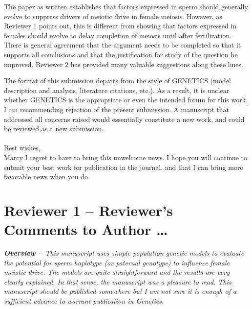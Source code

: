 \documentclass[12pt,letterpaper]{article}
\begin{document}
The paper as written establishes that factors expressed in sperm should generally evolve to suppress drivers of meiotic drive in female meiosis.  However, as Reviewer 1 points out, this is different from showing that factors expressed in females should evolve to delay completion of meiosis until after fertilization.  There is general agreement that the argument needs to be completed so that it supports all conclusions and that the justification for study of the question be improved.  Reviewer 2 has provided many valuable suggestions along these lines. \newline

The format of this submission departs from the style of GENETICS (model description and analysis, literature citations, etc.).  As a result, it is unclear whether GENETICS is the appropriate or even the intended forum for this work.  I am recommending rejection of the present submission.  A manuscript that addressed all concerns raised would essentially constitute a new work, and could be reviewed as a new submission. \\ \\
Best wishes, \\
Marcy \newline 
I regret to have to bring this unwelcome news.  I hope you will continue to submit your best work for publication in the journal, and that I can bring more favorable news when you do.
\newpage




\section*{Reviewer 1 -- Reviewer's Comments to Author \dots}

\emph{{\bf{Overview -- }} This manuscript uses simple population genetic models to evaluate the potential
for sperm haplotype (or paternal genotype) to influence female meiotic drive. 
The models are quite straightforward and the results are very clearly explained.
 In that sense, the manuscript was a pleasure to read.  This manuscript should
be published somewhere but I am not sure it is enough of a sufficient advance to
warrant publication in Genetics.}
\end{document}
